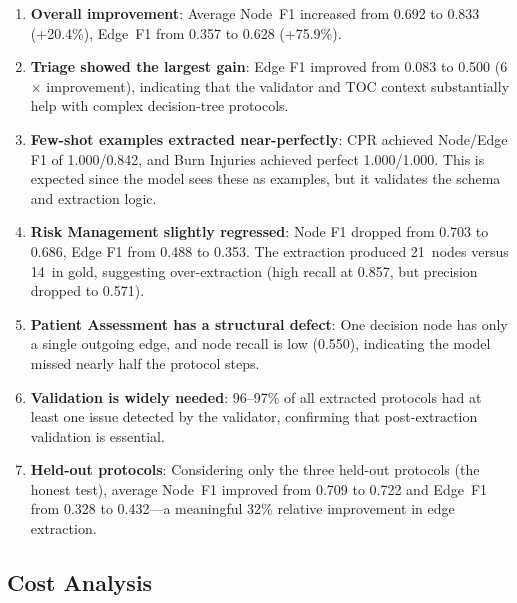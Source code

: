 \documentclass[12pt,a4paper]{article}
\begin{document}
\begin{enumerate}[leftmargin=2em]
    \item \textbf{Overall improvement}: Average Node~F1 increased from 0.692 to 0.833 (+20.4\%), Edge~F1 from 0.357 to 0.628 (+75.9\%).

    \item \textbf{Triage showed the largest gain}: Edge F1 improved from 0.083 to 0.500 (6$\times$ improvement), indicating that the validator and TOC context substantially help with complex decision-tree protocols.

    \item \textbf{Few-shot examples extracted near-perfectly}: CPR achieved Node/Edge F1 of 1.000/0.842, and Burn Injuries achieved perfect 1.000/1.000. This is expected since the model sees these as examples, but it validates the schema and extraction logic.

    \item \textbf{Risk Management slightly regressed}: Node F1 dropped from 0.703 to 0.686, Edge F1 from 0.488 to 0.353. The extraction produced 21~nodes versus 14~in gold, suggesting over-extraction (high recall at 0.857, but precision dropped to 0.571).

    \item \textbf{Patient Assessment has a structural defect}: One decision node has only a single outgoing edge, and node recall is low (0.550), indicating the model missed nearly half the protocol steps.

    \item \textbf{Validation is widely needed}: 96--97\% of all extracted protocols had at least one issue detected by the validator, confirming that post-extraction validation is essential.

    \item \textbf{Held-out protocols}: Considering only the three held-out protocols (the honest test), average Node~F1 improved from 0.709 to 0.722 and Edge~F1 from 0.328 to 0.432---a meaningful 32\% relative improvement in edge extraction.
\end{enumerate}

\subsection{Cost Analysis}
\end{document}
